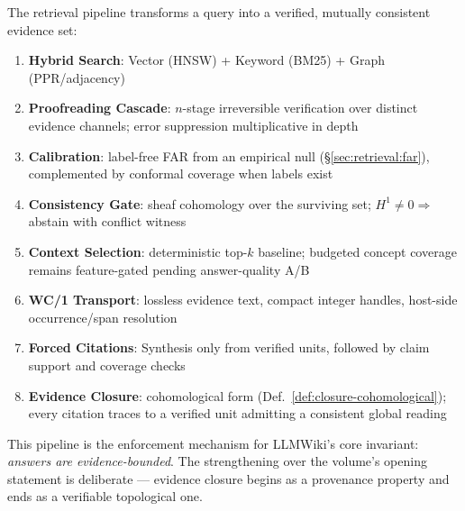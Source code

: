 The retrieval pipeline transforms a query into a verified, mutually consistent evidence set:
\begin{enumerate}
  \item \textbf{Hybrid Search}: Vector (HNSW) + Keyword (BM25) + Graph (PPR/adjacency)
  \item \textbf{Proofreading Cascade}: $n$-stage irreversible verification over distinct evidence channels; error suppression multiplicative in depth
  \item \textbf{Calibration}: label-free FAR from an empirical null (\S\ref{sec:retrieval:far}), complemented by conformal coverage when labels exist
  \item \textbf{Consistency Gate}: sheaf cohomology over the surviving set; $H^1 \neq 0 \Rightarrow$ abstain with conflict witness
  \item \textbf{Context Selection}: deterministic top-$k$ baseline; budgeted concept coverage remains feature-gated pending answer-quality A/B
  \item \textbf{WC/1 Transport}: lossless evidence text, compact integer handles, host-side occurrence/span resolution
  \item \textbf{Forced Citations}: Synthesis only from verified units, followed by claim support and coverage checks
  \item \textbf{Evidence Closure}: cohomological form (Def.~\ref{def:closure-cohomological}); every citation traces to a verified unit admitting a consistent global reading
\end{enumerate}
This pipeline is the enforcement mechanism for LLMWiki's core invariant: \emph{answers are evidence-bounded}. The strengthening over the volume's opening statement is deliberate --- evidence closure begins as a provenance property and ends as a verifiable topological one.

